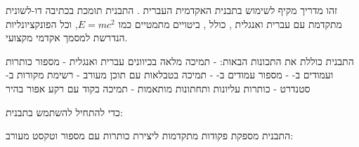 \documentclass{hebrew-academic-template}
\begin{document}
\maketitle

\tableofcontents
\newpage



זהו מדריך מקיף לשימוש בתבנית האקדמית העברית . התבנית תומכת בכתיבה דו-לשונית מתקדמת עם עברית  ואנגלית , כולל , ביטויים מתמטיים כמו $E = mc^2$, וכל הפונקציונליות הנדרשת למסמך אקדמי מקצועי.

התבנית כוללת את התכונות הבאות:
- תמיכה מלאה בכיוונים עברית  ואנגלית 
- מספור כותרות ועמודים ב-
- מספור עמודים ב-
- תמיכה בטבלאות עם תוכן מעורב
- רשימת מקורות ב- סטנדרט
- כותרות עליונות ותחתונות מותאמות
- תמיכה בקוד  עם רקע אפור בהיר


כדי להתחיל להשתמש בתבנית:





התבנית מספקת פקודות מתקדמות ליצירת כותרות עם מספור  וטקסט מעורב:

\begin{pythonbox}


\end{pythonbox}
\end{document}
